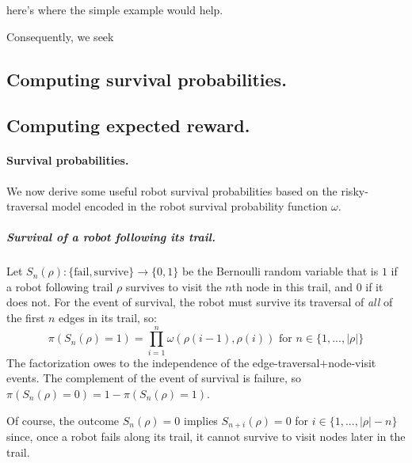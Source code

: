 \documentclass[11pt, oneside]{article}
\begin{document}
{\color{red} here's where the simple example would help.}

Consequently, we seek

\subsection{Computing survival probabilities.}

\subsection{Computing expected reward.}
\paragraph{Survival probabilities.} 
We now derive some useful robot survival probabilities based on the risky-traversal model encoded in the robot survival probability function $\omega$.

\subparagraph{Survival of a robot following its trail.}
Let $S_n(\rho) : \{\text{fail}, \text{survive}\} \rightarrow \{0, 1\} $ be the Bernoulli random variable that is $1$ if a robot following trail $\rho$ survives to visit the $n$th node in this trail, and $0$ if it does not. For the event of survival, the robot must survive its traversal of \emph{all} of the first $n$ edges in its trail, so:
\begin{equation}
	\pi(S_n(\rho) = 1) = \prod_{i=1}^n \omega(\rho(i-1), \rho(i)) \text{ for } n\in \{1, ..., \lvert \rho \rvert\} \label{eq:pi_S_n}
\end{equation} The factorization owes to the independence of the edge-traversal$+$node-visit events.
The complement of the event of survival is failure, so $\pi(S_n(\rho) = 0)=1-\pi(S_n(\rho) = 1)$.

Of course, the outcome $S_n(\rho)=0$ implies $S_{n+i}(\rho)=0$ for $i \in \{1, ..., \lvert \rho \rvert - n\}$ since, once a robot fails along its trail, it cannot survive to visit nodes later in the trail.
\end{document}
